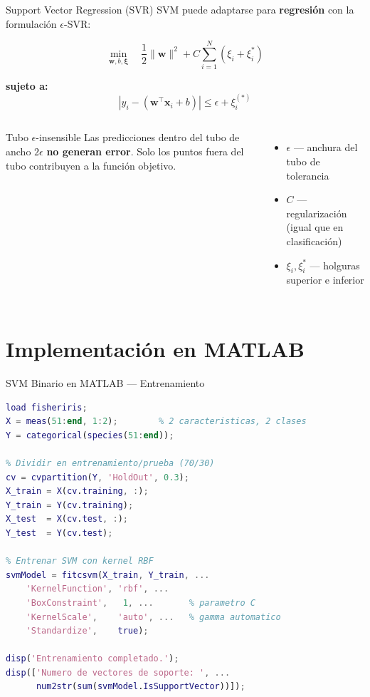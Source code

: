\documentclass[aspectratio=169,xcolor=dvipsnames]{beamer}
\begin{document}
\begin{frame}{Support Vector Regression (SVR)}
    SVM puede adaptarse para \textbf{regresión} con la formulación $\epsilon$-SVR:

    \begin{equation}
        \min_{\mathbf{w},b,\boldsymbol{\xi}} \quad \frac{1}{2}\|\mathbf{w}\|^2 + C \sum_{i=1}^{N} (\xi_i + \xi_i^*)
    \end{equation}

    \textbf{sujeto a:}
    \begin{equation}
        |y_i - (\mathbf{w}^\top\mathbf{x}_i + b)| \leq \epsilon + \xi_i^{(*)}
    \end{equation}

    \begin{columns}
        \begin{block}{Tubo $\epsilon$-insensible}
            Las predicciones dentro del tubo de ancho $2\epsilon$ \textbf{no generan error}. Solo los puntos fuera del tubo contribuyen a la función objetivo.
        \end{block}

        \begin{itemize}
            \item $\epsilon$ — anchura del tubo de tolerancia
            \item $C$ — regularización (igual que en clasificación)
            \item $\xi_i, \xi_i^*$ — holguras superior e inferior
        \end{itemize}
    \end{columns}
\end{frame}

\section{Implementación en MATLAB}

\begin{frame}[fragile]{SVM Binario en MATLAB — Entrenamiento}
\begin{lstlisting}[language=Matlab, style=MATLABStyle]
% Cargar o generar datos
load fisheriris;
X = meas(51:end, 1:2);        % 2 caracteristicas, 2 clases
Y = categorical(species(51:end));

% Dividir en entrenamiento/prueba (70/30)
cv = cvpartition(Y, 'HoldOut', 0.3);
X_train = X(cv.training, :);
Y_train = Y(cv.training);
X_test  = X(cv.test, :);
Y_test  = Y(cv.test);

% Entrenar SVM con kernel RBF
svmModel = fitcsvm(X_train, Y_train, ...
    'KernelFunction', 'rbf', ...
    'BoxConstraint',   1, ...       % parametro C
    'KernelScale',    'auto', ...   % gamma automatico
    'Standardize',    true);

disp('Entrenamiento completado.');
disp(['Numero de vectores de soporte: ', ...
      num2str(sum(svmModel.IsSupportVector))]);
\end{lstlisting}
\end{frame}
\end{document}
